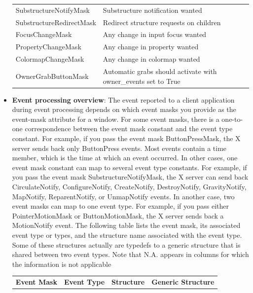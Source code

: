 \documentclass{report}
\begin{document}
\begin{itemize}
\begin{center}
\begin{tabularx}{\textwidth}{@{}lX@{}}
                    SubstructureNotifyMask& Substructure notification wanted\\[2ex]
                    SubstructureRedirectMask& Redirect structure requests on children\\[2ex]
                    FocusChangeMask& Any change in input focus wanted\\[2ex]
                    PropertyChangeMask& Any change in property wanted\\[2ex]
                    ColormapChangeMask& Any change in colormap wanted\\[2ex]
                    OwnerGrabButtonMask& Automatic grabs should activate with owner\_events set to True \\
                    \bottomrule
                \end{tabularx}
            \end{center}
        \item \textbf{Event processing overview}: The event reported to a client application during event processing depends on which event masks you provide as the event-mask attribute for a window. For some event masks, there is a one-to-one correspondence between the event mask constant and the event type constant. For example, if you pass the event mask ButtonPressMask, the X server sends back only ButtonPress events. Most events contain a time member, which is the time at which an event occurred.
            \bigbreak \noindent 
            In other cases, one event mask constant can map to several event type constants. For example, if you pass the event mask SubstructureNotifyMask, the X server can send back CirculateNotify, ConfigureNotify, CreateNotify, DestroyNotify, GravityNotify, MapNotify, ReparentNotify, or UnmapNotify events.
            \bigbreak \noindent 
            In another case, two event masks can map to one event type. For example, if you pass either PointerMotionMask or ButtonMotionMask, the X server sends back a MotionNotify event.
            \bigbreak \noindent 
            The following table lists the event mask, its associated event type or types, and the structure name associated with the event type. Some of these structures actually are typedefs to a generic structure that is shared between two event types. Note that N.A. appears in columns for which the information is not applicable
            \begin{center}
                \begin{tabularx}{\textwidth}{@{}XlXl@{}}
                    \toprule
                    \textbf{Event Mask}& \textbf{Event Type}& \textbf{Structure} &\textbf{Generic Structure} \\

\end{tabularx}
\end{center}
\end{itemize}
\end{document}
